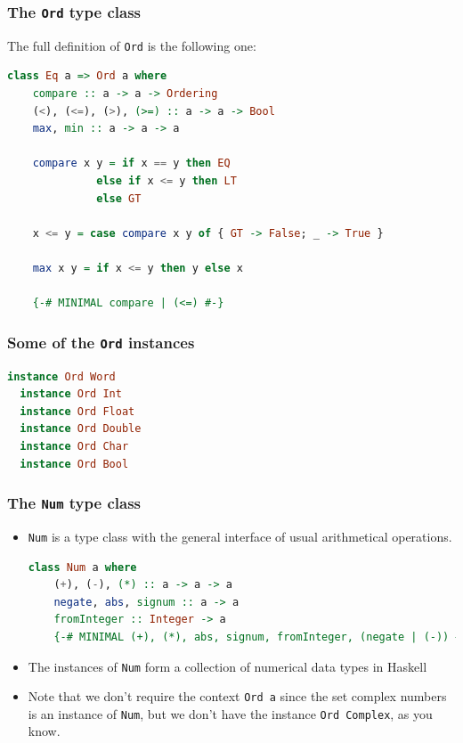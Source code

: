 \documentclass[10pt,pdf,utf8,russian,aspectratio=169]{beamer}
\begin{document}
\begin{frame}[fragile]
  \frametitle{The \verb"Ord" type class}

The full definition of \verb"Ord" is the following one:

  \begin{lstlisting}[language=Haskell]
  class Eq a => Ord a where
    compare :: a -> a -> Ordering
    (<), (<=), (>), (>=) :: a -> a -> Bool
    max, min :: a -> a -> a

    compare x y = if x == y then EQ
              else if x <= y then LT
              else GT

    x <= y = case compare x y of { GT -> False; _ -> True }

    max x y = if x <= y then y else x

    {-# MINIMAL compare | (<=) #-}
  \end{lstlisting}
\end{frame}

\begin{frame}[fragile]
  \frametitle{Some of the \verb"Ord" instances}

\begin{lstlisting}[language=Haskell]
  instance Ord Word
  instance Ord Int
  instance Ord Float
  instance Ord Double
  instance Ord Char
  instance Ord Bool
\end{lstlisting}
\end{frame}

\begin{frame}[fragile]
  \frametitle{The \verb"Num" type class}

\begin{itemize}
  \item \verb"Num" is a type class with the general interface of usual arithmetical operations.
  \begin{lstlisting}[language=Haskell]
  class Num a where
    (+), (-), (*) :: a -> a -> a
    negate, abs, signum :: a -> a
    fromInteger :: Integer -> a
    {-# MINIMAL (+), (*), abs, signum, fromInteger, (negate | (-)) #-}
  \end{lstlisting}
  \item The instances of \verb"Num" form a collection of numerical data types in Haskell
  \item Note that we don't require the context \verb"Ord a" since the set complex numbers is an instance of \verb"Num", but we don't have the instance \verb"Ord Complex", as you know.
\end{itemize}
\end{frame}
\end{document}
